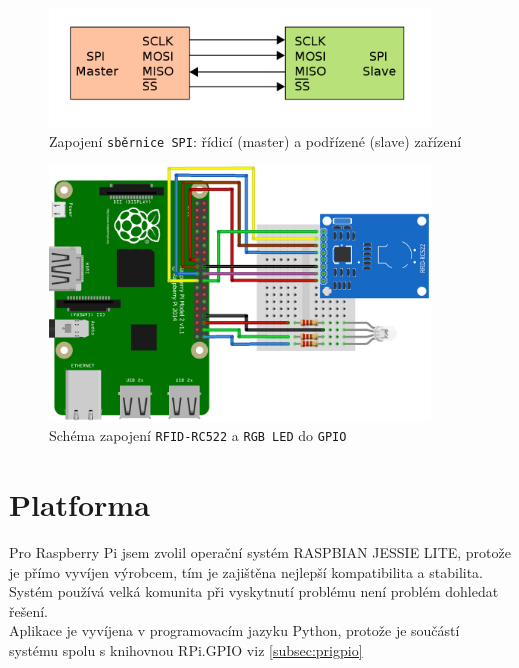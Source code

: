 \documentclass[czech,BP]{thesiskiv}
\begin{document}
	\begin{figure}[h]
		\centering
		\includegraphics[width=0.9\textwidth]{../images/spi.png}	
		\caption{Zapojení \texttt{sběrnice SPI}: řídicí (master) a podřízené (slave) zařízení}
		\label{fig:spi}
	\end{figure}
	



	\begin{figure}[h]
		\centering
		\includegraphics[width=0.9\textwidth]{../diagrams/reader_rfid_diagram_bb.png}	
		\caption{Schéma zapojení \texttt{RFID-RC522} a \texttt{RGB LED} do \texttt{GPIO}}
		\label{fig:reader_rfid_diagram}
	\end{figure}	
	
	

	\section{Platforma}
		Pro Raspberry Pi jsem zvolil operační systém RASPBIAN JESSIE LITE, protože je přímo vyvíjen výrobcem, tím je zajištěna nejlepší kompatibilita a stabilita. Systém používá velká komunita při vyskytnutí problému není problém dohledat řešení.\\
		Aplikace je vyvíjena v programovacím jazyku Python, protože je součástí systému spolu s knihovnou RPi.GPIO viz \ref{subsec:prigpio}
	
\end{document}
